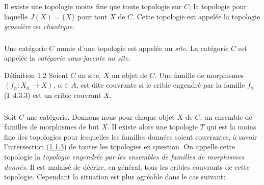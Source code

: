 Il existe une topologie moins fine que toute topologie sur $C$; la
topologie pour laquelle $J(X)=\{X\}$ pour tout $X$ de $C$. Cette
topologie est appelée la topologie \emph{grossière} ou
\emph{chaotique}.

\subsubsection{}
Une catégorie $C$ munie d'une topologie est appelée un \emph{site.}
La catégorie $C$ est appelée la \emph{catégorie
  sous-jacente au site.}

\begin{enonce*}{Définition 1.2}
Soient $C$ un site, $X$ un objet de $C$. Une famille de morphismes
$(f_{\alpha}:X_{\alpha}\rightarrow X)$, $\alpha\in A$, est dite
couvrante si le crible engendré par la famille $f_{\alpha}$
{\rm(I~4.3.3)} est un crible couvrant $X$.
\end{enonce*}

\subsubsection{}
Soit $C$ une catégorie. Donnons-nous pour chaque objet $X$ de $C$,
un ensemble de familles de morphismes de but $X$. Il existe alors
une topologie $T$ qui est la moins fine des topologies pour
lesquelles les familles données soient couvrantes, à savoir
l'intersection (\hyperref[II.subsubsec1.1.3]{1.1.3}) de toutes les topologies en
question. On appelle cette topologie la \emph{topologie engendrée
par les ensembles de familles
  de morphismes donnés}. Il est malaisé de décrire, en
général, tous les cribles couvrants de cette topologie.
Cependant la situation est plus agréable dans le cas suivant:

